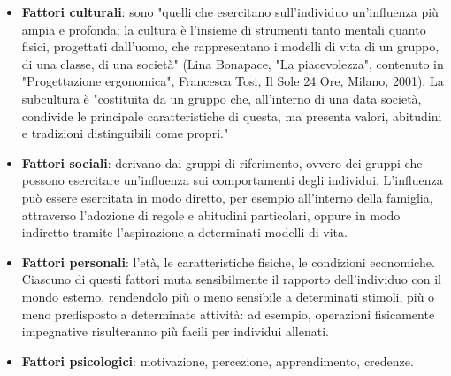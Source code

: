 \documentclass[11pt,a4paper]{article}
\begin{document}
\begin{itemize}
	\item \textbf{Fattori culturali}: sono "quelli che esercitano sull'individuo un'influenza più ampia e profonda; la cultura è l'insieme di strumenti tanto mentali quanto fisici, progettati dall'uomo, che rappresentano i modelli di vita di un gruppo, di una classe, di una società" (Lina Bonapace, "La piacevolezza", contenuto in "Progettazione ergonomica", Francesca Tosi, Il Sole 24 Ore, Milano, 2001). La subcultura è "costituita da un gruppo che, all'interno di una data società, condivide le principale caratteristiche di questa, ma presenta valori, abitudini e tradizioni distinguibili come propri."
	\item \textbf{Fattori sociali}: derivano dai gruppi di riferimento, ovvero dei gruppi che possono esercitare un'influenza sui comportamenti degli individui. L'influenza può essere esercitata in modo diretto, per esempio all'interno della famiglia, attraverso l'adozione di regole e abitudini particolari, oppure in modo indiretto tramite l'aspirazione a determinati modelli di vita.
	\item \textbf{Fattori personali}: l'età, le caratteristiche fisiche, le condizioni economiche. Ciascuno di questi fattori muta sensibilmente il rapporto dell'individuo con il mondo esterno, rendendolo più o meno sensibile a determinati stimoli, più o meno predisposto a determinate attività: ad esempio, operazioni fisicamente impegnative risulteranno più facili per individui allenati.
	\item \textbf{Fattori psicologici}: motivazione, percezione, apprendimento, credenze.
\end{itemize}
\end{document}
